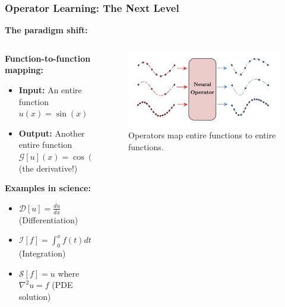 \documentclass[notes]{beamer}
\begin{document}
\begin{frame}
\frametitle{Operator Learning: The Next Level}

\textbf{The paradigm shift:}

\begin{columns}[T]
    \begin{column}{0.5\textwidth}
        \textbf{Function-to-function mapping:}
        \begin{itemize}
            \item \textbf{Input:} An entire function $u(x) = \sin(x)$
            \item \textbf{Output:} Another entire function $\mathcal{G}[u](x) = \cos(x)$ (the derivative!)
        \end{itemize}
        
        \vspace{0.5cm}
        
        \textbf{Examples in science:}
        \begin{itemize}
            \item $\mathcal{D}[u] = \frac{du}{dx}$ (Differentiation)
            \item $\mathcal{I}[f] = \int_0^x f(t) dt$ (Integration)
            \item $\mathcal{S}[f] = u$ where $\nabla^2 u = f$ (PDE solution)
        \end{itemize}
    \end{column}
    \begin{column}{0.5\textwidth}
        \begin{figure}[ht]
            \centering
            \includegraphics[width=\linewidth]{figs/operator_concept.png}
            \caption*{Operators map entire functions to entire functions.}
        \end{figure}
    \end{column}
\end{columns}

\end{frame}
\end{document}
